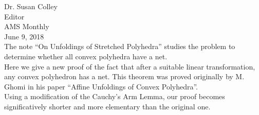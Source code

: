 \documentclass[openright, 12pt]{book}
\begin{document}
Dr. Susan Colley\\
Editor\\
AMS Monthly\\

\noindent June 9, 2018\\

\noindent The note ``On Unfoldings of Stretched Polyhedra'' studies the problem to determine whether all convex polyhedra have a net.\\

Here we give a new proof of the fact that after a suitable linear transformation, any convex polyhedron has a net. This theorem was proved originally by M. Ghomi in his paper ``Affine Unfoldings of Convex Polyhedra''.\\


Using a modification of the Cauchy's Arm Lemma, our proof becomes significatively shorter and more elementary than the original one.\\
\end{document}
